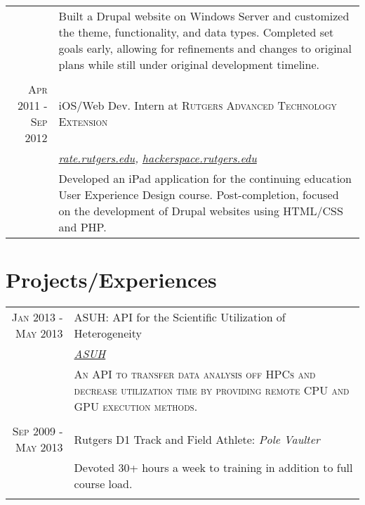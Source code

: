 \documentclass[a4paper, 10pt, onepage]{article} %
\begin{document}
\begin{tabular}{r|p{10cm}}
& \footnotesize{Built a Drupal website on Windows Server and customized the theme, functionality, and data types. Completed set goals early, allowing for refinements and changes to original plans while still under original development timeline.}\\
\multicolumn{2}{c}{}\\
\textsc{Apr 2011 - Sep 2012} & iOS/Web Dev. Intern at \textsc{Rutgers Advanced Technology Extension}\\
& \small\emph{\href{http://rate.rutgers.edu}{rate.rutgers.edu}, \href{http://hackerspace.rutgers.edu}{hackerspace.rutgers.edu}}\\
& \footnotesize{Developed an iPad application for the continuing education User Experience Design course. Post-completion, focused on the development of Drupal websites using HTML/CSS and PHP.}
\end{tabular}
\section{Projects/Experiences}
\begin{tabular}{rp{10cm}}
\textsc{Jan 2013 - May 2013} & ASUH: API for the Scientific Utilization of Heterogeneity\\
& \small\emph{\href{http://github.com/jlee734/ASUH}{ASUH}}\\
& \small\textsc{An API to transfer data analysis off HPCs and decrease utilization time by providing remote CPU and GPU execution methods.}\\
\multicolumn{2}{c}{}\\
\textsc{Sep 2009 - May 2013} & Rutgers D1 Track and Field Athlete: \emph{Pole Vaulter}\\
& \small{Devoted 30+ hours a week to training in addition to full course load.}\\
\multicolumn{2}{c}{}\\
\end{tabular}
\end{document}
